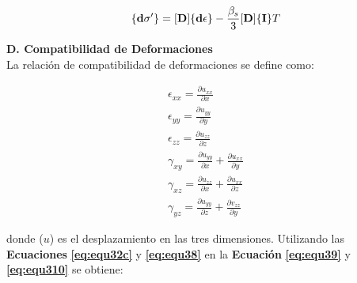 \begin{ceqn} 
\begin{gather} \label{eq:equ39} 
\normalsize{\{\mathbf{d\sigma'}\} = [\mathbf{D}] \{\mathbf{d\epsilon}\}} 
- \frac{\beta_s}{3}[\mathbf{D}]\{\mathbf{I}\}T
\end{gather}  
\end{ceqn}

\bigskip
\textbf{D. Compatibilidad de Deformaciones}
\\
La relación de compatibilidad de deformaciones se define como:

\begin{ceqn} 
\begin{subequations} \label{eq:equ310} 
\begin{gather}
\epsilon_{xx} = \frac{\partial u_{xx}}{\partial x} 
\label{eq:equ310a} \\[3pt]
\epsilon_{yy} = \frac{\partial u_{yy}}{\partial y}
\label{eq:equ310b} \\[3pt]
\epsilon_{zz} = \frac{\partial u_{zz}}{\partial z}
\label{eq:equ310c} \\[3pt]
\gamma_{xy} = \frac{\partial u_{yy}}{\partial x} + \frac{\partial u_{xx}}{\partial y}
\label{eq:equ310d} \\[3pt]
\gamma_{xz} = \frac{\partial u_{zz}}{\partial x} + \frac{\partial u_{xx}}{\partial z}
\label{eq:equ310e} \\[3pt]
\gamma_{yz} = \frac{\partial u_{yy}}{\partial z} + \frac{\partial v_{zz}}{\partial y}
\label{eq:equ310f}
\end{gather}  
\end{subequations} 
\end{ceqn}
donde ($u$) es el desplazamiento en las tres dimensiones. Utilizando las \textbf{Ecuaciones} \textbf{\ref{eq:equ32c}} y \textbf{\ref{eq:equ38}} en la \textbf{Ecuación} \textbf{\ref{eq:equ39}} y \textbf{\ref{eq:equ310}} se obtiene:

